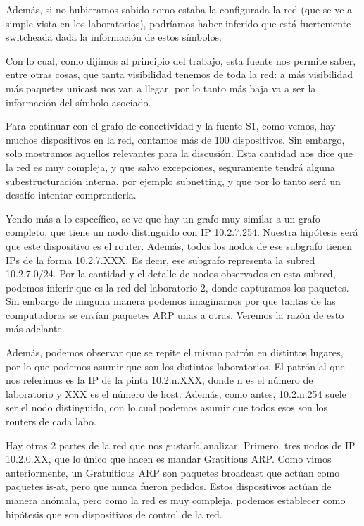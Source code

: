 Además, si no hubieramos sabido como estaba la configurada la red (que se ve a simple vista en los laboratorios), podríamos haber inferido que está fuertemente switcheada dada la información de estos símbolos.

Con lo cual, como dijimos al principio del trabajo, esta fuente nos permite saber, entre otras cosas, que tanta visibilidad tenemos de toda la red: a más visibilidad más paquetes unicast nos van a llegar, por lo tanto más baja va a ser la información del símbolo asociado.



Para continuar con el grafo de conectividad y la fuente S1, como vemos, hay muchos dispositivos en la red, contamos más de 100 dispositivos. Sin embargo, solo mostramos aquellos relevantes para la discusión. Esta cantidad nos dice que la red es muy compleja, y que salvo excepciones, seguramente tendrá alguna subestructuración interna, por ejemplo subnetting, y que por lo tanto será un desafío intentar comprenderla.


Yendo más a lo específico, se ve que hay un grafo muy similar a un grafo completo, que tiene un nodo distinguido con IP 10.2.7.254. Nuestra hipótesis será que este dispositivo es el router.
Además, todos los nodos de ese subgrafo tienen IPs de la forma 10.2.7.XXX.
Es decir, ese subgrafo representa la subred 10.2.7.0/24.
Por la cantidad y el detalle de nodos observados en esta subred, podemos inferir que es la red del laboratorio 2, donde capturamos los paquetes.
Sin embargo de ninguna manera podemos imaginarnos por que tantas de las computadoras se envían paquetes ARP unas a otras. Veremos la razón de esto más adelante.

Además, podemos observar que se repite el mismo patrón en distintos lugares, por lo que podemos asumir que son los distintos laboratorios. El patrón al que nos referimos es la IP de la pinta 10.2.n.XXX, donde n es el número de laboratorio y XXX es el número de host. Además, como antes, 10.2.n.254 suele ser el nodo distinguido, con lo cual podemos asumir que todos esos son los routers de cada labo.

Hay otras 2 partes de la red que nos gustaría analizar. Primero, tres nodos de IP 10.2.0.XX, que lo único que hacen es mandar Gratitious ARP. Como vimos anteriormente, un Gratuitious ARP son paquetes broadcast que actúan como paquetes is-at, pero que nunca fueron pedidos.
Estos dispositivos actúan de manera anómala, pero como la red es muy compleja, podemos establecer como hipótesis que son dispositivos de control de la red.

